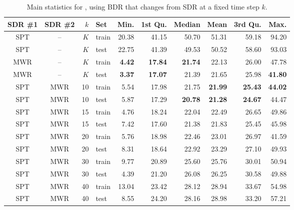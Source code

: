 \begin{table}[b]
\caption{Main statistics for  \namerho, using BDR that changes 
from SDR at a fixed time step $k$.}\label{tbl:BDR:stats} 
\centering
\begin{tabular}{ccrlrrrrrr}
  \toprule
  SDR \#1 & SDR \#2 & $k$ & Set & Min. & 1st Qu. & Median & Mean & 
    3rd Qu. & Max. \\ \midrule
  SPT & -- & $K$ & train & 20.38 & 41.15 & 50.70 & 51.31 & 59.18 & 94.20 \\ 
  SPT & -- & $K$ & test & 22.75 & 41.39 & 49.53 & 50.52 & 58.60 & 93.03 \\ 
  MWR & -- & $K$ & train & \textbf{4.42} & \textbf{17.84} & \textbf{21.74} & 
  22.13 & 26.00 & 47.78 \\ 
  MWR & -- & $K$ & test & \textbf{3.37} & \textbf{17.07} & 21.39 & 21.65 & 
  25.98 & \textbf{41.80} \\ 
  SPT & MWR & 10 & train & 5.54 & 17.98 & 21.75 & \textbf{21.99} & 
  \textbf{25.43} & \textbf{44.02} \\ 
  SPT & MWR & 10 & test & 5.87 & 17.29 & \textbf{20.78} & \textbf{21.28} & 
  \textbf{24.67} & 44.47 \\ 
  SPT & MWR & 15 & train & 4.76 & 18.24 & 22.04 & 22.49 & 26.65 & 49.86 \\ 
  SPT & MWR & 15 & test & 7.42 & 17.60 & 21.38 & 21.83 & 25.45 & 45.98 \\ 
  SPT & MWR & 20 & train & 5.76 & 18.98 & 22.46 & 23.01 & 26.97 & 41.59 \\ 
  SPT & MWR & 20 & test & 8.31 & 18.64 & 22.92 & 23.29 & 27.10 & 49.93 \\ 
  SPT & MWR & 30 & train & 9.77 & 20.89 & 25.60 & 25.76 & 30.01 & 50.94 \\ 
  SPT & MWR & 30 & test & 4.39 & 21.20 & 26.08 & 26.25 & 30.58 & 49.88 \\ 
  SPT & MWR & 40 & train & 13.04 & 23.42 & 28.12 & 28.94 & 33.67 & 54.98 \\ 
  SPT & MWR & 40 & test & 8.55 & 24.20 & 28.16 & 28.98 & 33.20 & 57.21 \\ 
  \bottomrule
\end{tabular}
\end{table}
